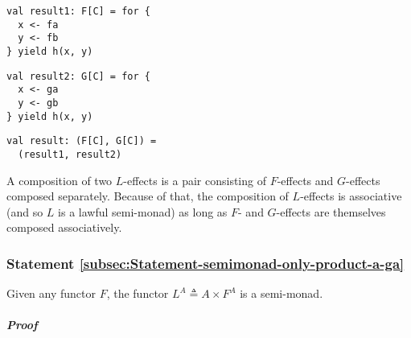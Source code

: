 \begin{center}
\begin{minipage}[t]{0.3\columnwidth}%
\begin{lstlisting}
val result1: F[C] = for {
  x <- fa
  y <- fb
} yield h(x, y)
\end{lstlisting}
%
\end{minipage}\hfill{} %
\begin{minipage}[t]{0.3\columnwidth}%
\begin{lstlisting}
val result2: G[C] = for {
  x <- ga
  y <- gb
} yield h(x, y)
\end{lstlisting}
%
\end{minipage}\hfill{} %
\begin{minipage}[t]{0.3\columnwidth}%
\begin{lstlisting}
val result: (F[C], G[C]) =
  (result1, result2)
\end{lstlisting}
%
\end{minipage}\vspace{-0.35\baselineskip}
\par\end{center}

A composition of two $L$-effects is a pair consisting of $F$-effects
and $G$-effects composed separately. Because of that, the composition
of $L$-effects is associative (and so $L$ is a lawful semi-monad)
as long as $F$- and $G$-effects are themselves composed associatively.

\subsubsection{Statement \label{subsec:Statement-semimonad-only-product-a-ga}\ref{subsec:Statement-semimonad-only-product-a-ga}}

Given any functor $F$, the functor $L^{A}\triangleq A\times F^{A}$
is a semi-monad.

\subparagraph{Proof}

